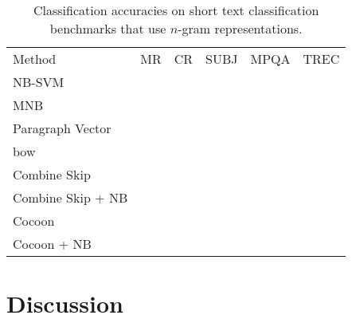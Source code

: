\documentclass{article}
\begin{document}
\begin{table}[htbp]
  \centering
  \begin{tabular}{l c c c c c}
    Method            & MR & CR & SUBJ & MPQA & TREC \\
    NB-SVM            &    &    &      &      &      \\
    MNB               &    &    &      &      &      \\
    Paragraph Vector  &    &    &      &      &      \\
    bow               &    &    &      &      &      \\
    Combine Skip      &    &    &      &      &      \\
    Combine Skip + NB &    &    &      &      &      \\\hline
    Cocoon            &    &    &      &      &      \\
    Cocoon + NB       &    &    &      &      &      \\
  \end{tabular}
  \caption{Classification accuracies on short text classification benchmarks
    that use $n$-gram representations.}
  \label{tab:classification}
\end{table}

\section{Discussion}
\label{sec:discussion}



\end{document}
